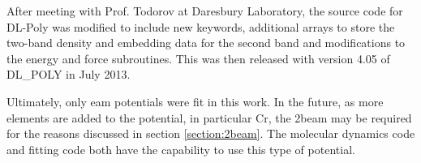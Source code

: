 After meeting with Prof. Todorov at Daresbury Laboratory, the source code for DL-Poly was modified to include new keywords, additional arrays to store the two-band density and embedding data for the second band and modifications to the energy and force subroutines.  This was then released with version 4.05 of DL\_POLY in July 2013.  

Ultimately, only \acrshort{eam} potentials were fit in this work.  In the future, as more elements are added to the potential, in particular Cr, the \acrshort{2beam} may be required for the reasons discussed in section \ref{section:2beam}.  The molecular dynamics code and fitting code both have the capability to use this type of potential.







